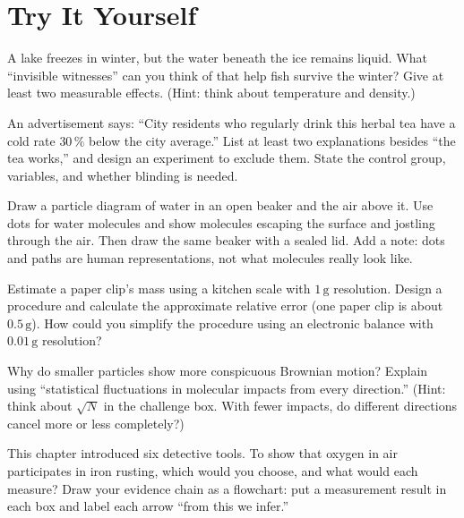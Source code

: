 \section*{Try It Yourself}

\begin{sikaoti}
\item A lake freezes in winter, but the water beneath the ice remains liquid. What ``invisible witnesses'' can you think of that help fish survive the winter? Give at least two measurable effects. (Hint: think about temperature and density.)
\item An advertisement says: ``City residents who regularly drink this herbal tea have a cold rate $30\,\%$ below the city average.'' List at least two explanations besides ``the tea works,'' and design an experiment to exclude them. State the control group, variables, and whether blinding is needed.
\item Draw a particle diagram of water in an open beaker and the air above it. Use dots for water molecules and show molecules escaping the surface and jostling through the air. Then draw the same beaker with a sealed lid. Add a note: dots and paths are human representations, not what molecules really look like.
\item Estimate a paper clip's mass using a kitchen scale with $1\,\mathrm{g}$ resolution. Design a procedure and calculate the approximate relative error (one paper clip is about $0.5\,\mathrm{g}$). How could you simplify the procedure using an electronic balance with $0.01\,\mathrm{g}$ resolution?
\item Why do smaller particles show more conspicuous Brownian motion? Explain using ``statistical fluctuations in molecular impacts from every direction.'' (Hint: think about $\sqrt{N}$ in the challenge box. With fewer impacts, do different directions cancel more or less completely?)
\item This chapter introduced six detective tools. To show that oxygen in air participates in iron rusting, which would you choose, and what would each measure? Draw your evidence chain as a flowchart: put a measurement result in each box and label each arrow ``from this we infer.''
\end{sikaoti}
